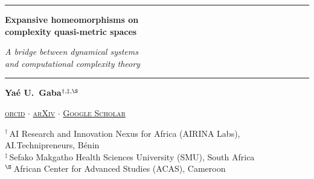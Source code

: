 \documentclass[11pt,a4paper]{article}
\theoremstyle{plain}
\theoremstyle{definition}
\begin{document}
\begin{titlepage}
\thispagestyle{titlepage}
\centering
\vspace*{0.6cm}

{\color{accent}\rule{0.4\textwidth}{0.8pt}}

\vspace{0.8cm}

{\huge\bfseries\color{accent} Expansive homeomorphisms on\\[0.5em]
 complexity quasi-metric spaces}

\vspace{0.5cm}
{\Large\itshape\color{accent!70!black} A bridge between dynamical systems\\[0.2em]
 and computational complexity theory}

\vspace{0.3cm}
{\color{accent}\rule{0.25\textwidth}{0.5pt}}

\vspace{0.8cm}

{\large
\textbf{Ya\'e U.\ Gaba}$^{\dagger,\ddagger,\S}$
}

\vspace{0.3cm}

{\small\color{red!70!black}
\href{https://orcid.org/0000-0001-8128-9704}{\textsc{orcid}}%
\enspace$\cdot$\enspace
\href{https://arxiv.org/a/gaba_y_1.html}{\textsc{arXiv}}%
\enspace$\cdot$\enspace
\href{https://scholar.google.com/citations?user=UTszjV4AAAAJ&hl=en}{\textsc{Google Scholar}}%
}

\vspace{0.5cm}

{\small
$^{\dagger}$\,AI Research and Innovation Nexus for Africa (AIRINA Labs),
AI.Technipreneurs, B\'enin\\[0.3em]
$^{\ddagger}$\,Sefako Makgatho Health Sciences University (SMU),
South Africa\\[0.3em]
$^{\S}$\,African Center for Advanced Studies (ACAS), Cameroon
}


\end{titlepage}
\end{document}
